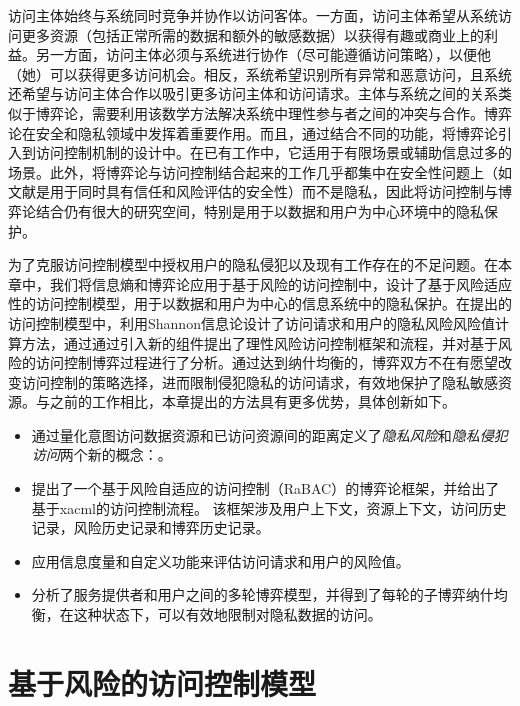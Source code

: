 访问主体始终与系统同时竞争并协作以访问客体。一方面，访问主体希望从系统访问更多资源（包括正常所需的数据和额外的敏感数据）以获得有趣或商业上的利益。另一方面，访问主体必须与系统进行协作（尽可能遵循访问策略），以便他（她）可以获得更多访问机会。相反，系统希望识别所有异常和恶意访问，且系统还希望与访问主体合作以吸引更多访问主体和访问请求。主体与系统之间的关系类似于博弈论\cite{gibbons1992game}，需要利用该数学方法解决系统中理性参与者之间的冲突与合作。博弈论在安全和隐私领域中发挥着重要作用\cite{do2017game,zhu2018game}。而且，通过结合不同的功能，将博弈论引入到访问控制机制的设计中\cite{hu2014game,zhang2015towards,liu2016dynamic,gao2018game, helil2017non}。在已有工作中，它适用于有限场景\cite{hu2014game,gao2018game}或辅助信息过多的场景\cite{zhang2015towards,liu2016dynamic,helil2017non}。此外，将博弈论与访问控制结合起来的工作几乎都集中在安全性问题上（如文献\cite{helil2017non}是用于同时具有信任和风险评估的安全性）而不是隐私，因此将访问控制与博弈论结合仍有很大的研究空间，特别是用于以数据和用户为中心环境中的隐私保护。

为了克服访问控制模型中授权用户的隐私侵犯以及现有工作存在的不足问题。在本章中，我们将信息熵和博弈论应用于基于风险的访问控制中，设计了基于风险适应性的访问控制模型，用于以数据和用户为中心的信息系统中的隐私保护。在提出的访问控制模型中，利用Shannon信息论设计了访问请求和用户的隐私风险风险值计算方法，通过通过引入新的组件提出了理性风险访问控制框架和流程，并对基于风险的访问控制博弈过程进行了分析。通过达到纳什均衡的，博弈双方不在有愿望改变访问控制的策略选择，进而限制侵犯隐私的访问请求，有效地保护了隐私敏感资源。与之前的工作相比，本章提出的方法具有更多优势，具体创新如下。

\begin{itemize}
	
	\item 通过量化意图访问数据资源和已访问资源间的距离定义了\textit{隐私风险}和\textit{隐私侵犯访问}两个新的概念：。
	\item 提出了一个基于风险自适应的访问控制（RaBAC）的博弈论框架，并给出了基于xacml的访问控制流程。
	该框架涉及用户上下文，资源上下文，访问历史记录，风险历史记录和博弈历史记录。
	\item 应用信息度量和自定义功能来评估访问请求和用户的风险值。
	\item 分析了服务提供者和用户之间的多轮博弈模型，并得到了每轮的子博弈纳什均衡，在这种状态下，可以有效地限制对隐私数据的访问。
\end{itemize}


\section{基于风险的访问控制模型}
\label{sec:preliminaries}

